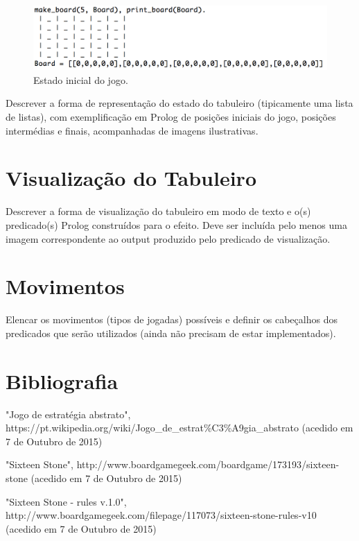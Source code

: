 \documentclass[a4paper]{article}
\begin{document}
\begin{figure}[!htb]
	\centering
	\includegraphics[scale=0.3]{images/make_board.png}
	\caption{Estado inicial do jogo.}
\end{figure}


Descrever a forma de representação do estado do tabuleiro (tipicamente uma lista de listas), com exemplificação em Prolog de posições iniciais do jogo, posições intermédias e finais, acompanhadas de imagens ilustrativas.


\section{Visualização do Tabuleiro}

Descrever a forma de visualização do tabuleiro em modo de texto e o(s) predicado(s) Prolog construídos para o efeito.
Deve ser incluída pelo menos uma imagem correspondente ao output produzido pelo predicado de visualização.


\section{Movimentos}

Elencar os movimentos (tipos de jogadas) possíveis e definir os cabeçalhos dos predicados que serão utilizados (ainda não precisam de estar implementados).

\newpage

\section*{Bibliografia}

"Jogo de estratégia abstrato", https://pt.wikipedia.org/wiki/Jogo\_de\_estrat\%C3\%A9gia\_abstrato (acedido em 7 de Outubro de 2015) \newline

"Sixteen Stone", http://www.boardgamegeek.com/boardgame/173193/sixteen-stone (acedido em 7 de Outubro de 2015) \newline

"Sixteen Stone - rules v.1.0", http://www.boardgamegeek.com/filepage/117073/sixteen-stone-rules-v10 (acedido em 7 de Outubro de 2015) \newline
\end{document}

